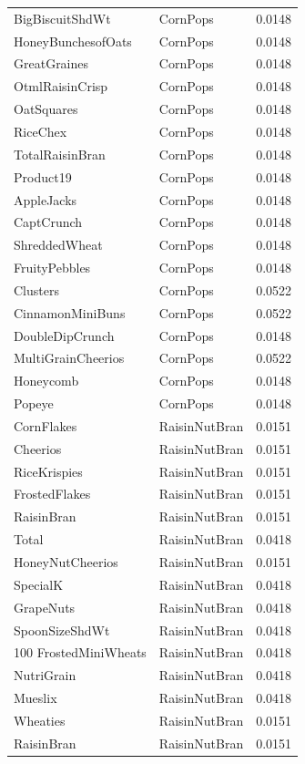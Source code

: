 \begin{longtable}{llr}
BigBiscuitShdWt & CornPops & 0.0148 \\
HoneyBunchesofOats & CornPops & 0.0148 \\
GreatGraines & CornPops & 0.0148 \\
OtmlRaisinCrisp & CornPops & 0.0148 \\
OatSquares & CornPops & 0.0148 \\
RiceChex & CornPops & 0.0148 \\
TotalRaisinBran & CornPops & 0.0148 \\
Product19 & CornPops & 0.0148 \\
AppleJacks & CornPops & 0.0148 \\
CaptCrunch & CornPops & 0.0148 \\
ShreddedWheat & CornPops & 0.0148 \\
FruityPebbles & CornPops & 0.0148 \\
Clusters & CornPops & 0.0522 \\
CinnamonMiniBuns & CornPops & 0.0522 \\
DoubleDipCrunch & CornPops & 0.0148 \\
MultiGrainCheerios & CornPops & 0.0522 \\
Honeycomb & CornPops & 0.0148 \\
Popeye & CornPops & 0.0148 \\
CornFlakes & RaisinNutBran & 0.0151 \\
Cheerios & RaisinNutBran & 0.0151 \\
RiceKrispies & RaisinNutBran & 0.0151 \\
FrostedFlakes & RaisinNutBran & 0.0151 \\
RaisinBran & RaisinNutBran & 0.0151 \\
Total & RaisinNutBran & 0.0418 \\
HoneyNutCheerios & RaisinNutBran & 0.0151 \\
SpecialK & RaisinNutBran & 0.0418 \\
GrapeNuts & RaisinNutBran & 0.0418 \\
SpoonSizeShdWt & RaisinNutBran & 0.0418 \\
100%
FrostedMiniWheats & RaisinNutBran & 0.0418 \\
NutriGrain & RaisinNutBran & 0.0418 \\
Mueslix & RaisinNutBran & 0.0418 \\
Wheaties & RaisinNutBran & 0.0151 \\
RaisinBran & RaisinNutBran & 0.0151 \\

\end{longtable}
